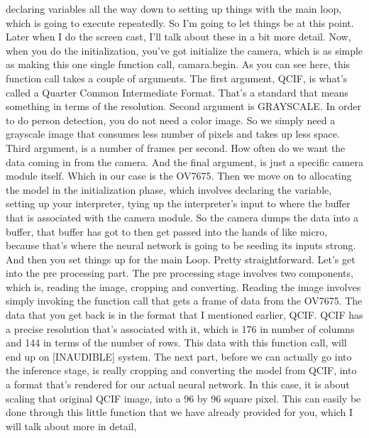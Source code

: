     declaring variables all the way down to setting up
    things with the main loop, which is going to execute repeatedly.
    So I'm going to let things be at this point.
    Later when I do the screen cast, I'll talk about these in a bit more detail.
    Now, when you do the initialization, you've
    got initialize the camera, which is as simple as making this one
    single function call, camara.begin.
    As you can see here, this function call takes a couple of arguments.
    The first argument, QCIF, is what's called a Quarter Common Intermediate
    Format.
    That's a standard that means something in terms of the resolution.
    Second argument is GRAYSCALE.
    In order to do person detection, you do not need a color image.
    So we simply need a grayscale image that consumes less number of pixels
    and takes up less space.
    Third argument, is a number of frames per second.
    How often do we want the data coming in from the camera.
    And the final argument, is just a specific camera module itself.
    Which in our case is the OV7675.
    Then we move on to allocating the model in the initialization phase, which
    involves declaring the variable, setting up your interpreter,
    tying up the interpreter's input to where the buffer that
    is associated with the camera module.
    So the camera dumps the data into a buffer,
    that buffer has got to then get passed into the hands of like micro,
    because that's where the neural network is
    going to be seeding its inputs strong.
    And then you set things up for the main Loop.
    Pretty straightforward.
    Let's get into the pre processing part.
    The pre processing stage involves two components, which is,
    reading the image, cropping and converting.
    Reading the image involves simply invoking the function call that
    gets a frame of data from the OV7675.
    The data that you get back is in the format that I mentioned earlier, QCIF.
    QCIF has a precise resolution that's associated
    with it, which is 176 in number of columns
    and 144 in terms of the number of rows.
    This data with this function call, will end up on [INAUDIBLE] system.
    The next part, before we can actually go into the inference stage,
    is really cropping and converting the model from QCIF,
    into a format that's rendered for our actual neural network.
    In this case, it is about scaling that original QCIF image, into a 96
    by 96 square pixel.
    This can easily be done through this little function
    that we have already provided for you, which I will talk about more in detail,
